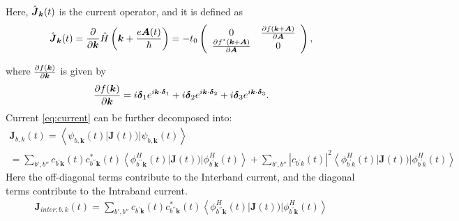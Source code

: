 Here, $\hat {\boldsymbol J}_{\boldsymbol k}(t)$ is the current operator, and it is defined as
\begin{align}
\hat {\boldsymbol J}_{\boldsymbol k}(t) = \frac{\partial }{\partial \boldsymbol k}\hat H \left (\boldsymbol k + \frac{e\boldsymbol A(t)}{\hbar} \right ) = 
-t_0 \left(\begin{array}{cc}
0 & \frac{\partial f(\boldsymbol{k}+\boldsymbol{A})}{\partial \boldsymbol A} \\
\frac{\partial f^*(\boldsymbol{k}+\boldsymbol{A})}{\partial \boldsymbol A}  & 0
\end{array}\right),
\end{align}

where $\frac{\partial f(\boldsymbol k)}{\partial \boldsymbol k}$ is given by 
\begin{align}
\frac{\partial f(\boldsymbol k)}{\partial \boldsymbol k}=i \boldsymbol{\delta}_1e^{i\boldsymbol k \cdot \boldsymbol \delta_1}
+i \boldsymbol{\delta}_2e^{i\boldsymbol k \cdot \boldsymbol \delta_2}
+i \boldsymbol{\delta}_3e^{i\boldsymbol k \cdot \boldsymbol \delta_3}.
\end{align}
Current \ref{eq:current} can be further decomposed into:
\begin{equation}
\begin{array}{l}
\boldsymbol{J}_{b,k}(t)=\left\langle \psi_{b, \boldsymbol{k}}(t)|\boldsymbol{J}(t))| \psi_{b, \boldsymbol{k}}(t)\right\rangle \\
=\sum\limits_{b',b''} c_{b^{\prime} \boldsymbol{k}}(t) c_{b^{\prime \prime} \boldsymbol{k}}^{*}(t)\left\langle \phi_{b^{\prime \prime} \boldsymbol{k}}^{H}(t)|\boldsymbol{J}(t))| \phi_{b^{\prime} \boldsymbol{k}}^{H}(t)\right\rangle+\sum\limits_{b',b''}\left|c_{b^{\prime} k}(t)\right|^{2}\left\langle \phi_{b^{\prime} k}^{H}(t)|\boldsymbol{J}(t))| \phi_{b^{\prime} k}^{H}(t)\right\rangle
\end{array}
    \label{totalcurrent}
\end{equation}
Here the off-diagonal terms contribute to the Interband current, and the diagonal terms contribute to the Intraband current. \\
\begin{equation}
\begin{array}{l}
\boldsymbol{J}_{inter;b,k}(t)=\sum\limits_{b',b''} c_{b^{\prime} \boldsymbol{k}}(t) c_{b^{\prime \prime} \boldsymbol{k}}^{*}(t)\left\langle \phi_{b^{\prime \prime} \boldsymbol{k}}^{H}(t)|\boldsymbol{J}(t))| \phi_{b^{\prime} \boldsymbol{k}}^{H}(t)\right\rangle
\end{array}
    \label{intercurrent}
\end{equation}

